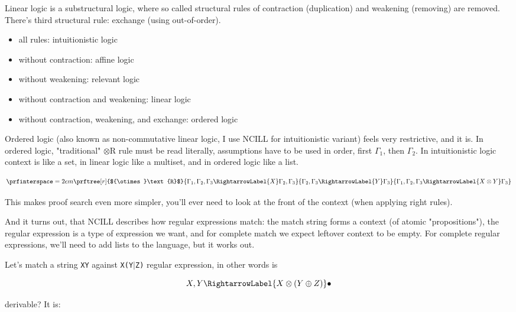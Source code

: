 \documentclass{article}
\begin{document}
Linear logic is a substructural logic, where so called structural rules
of contraction (duplication) and weakening (removing) are removed.
There's third structural rule: exchange (using out-of-order).

\begin{itemize}
  \item all rules: intuitionistic logic
  \item without contraction: affine logic
  \item without weakening: relevant logic
  \item without contraction and weakening: linear logic
  \item without contraction, weakening, and exchange: ordered logic
\end{itemize}

Ordered logic (also known as non-commutative linear logic, I use NCILL for intuitionistic variant)
feels very restrictive, and it is. In ordered logic,
"traditional" ${\otimes}\text{R}$ rule must be read literally,
assumptions have to be used in order, first $\Gamma_1$, then $\Gamma_2$.
In intuitionistic logic context is like a set, in linear logic
like a multiset, and in ordered logic like a list.

\begin{equation*}
\prfinterspace=2em
\prftree[r]{${\otimes}\text{R}$}
{\Gamma_1, \Gamma_2, \Gamma_3 \RightarrowLabel{X} \Gamma_2, \Gamma_3}
{\Gamma_2, \Gamma_3 \RightarrowLabel{Y} \Gamma_3}
{\Gamma_1, \Gamma_2, \Gamma_3 \RightarrowLabel{X \otimes Y} \Gamma_3}
\end{equation*}

This makes proof search even more simpler, you'll ever need to look at the
front of the context (when applying right rules).

And it turns out, that NCILL describes how regular expressions match:
the match string forms a context (of atomic "propositions"), the regular expression
is a type of expression we want, and for complete match we expect
leftover context to be empty. For complete regular expressions, we'll
need to add lists to the language, but it works out.

Let's match a string \texttt{XY} against \texttt{X(Y$|$Z)} regular expression,
in other words is

\begin{equation*}
  X, Y \RightarrowLabel{X \otimes (Y \oplus Z)} \bullet
\end{equation*}

derivable? It is:
\end{document}

